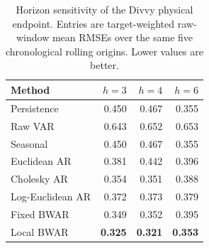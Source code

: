 \begin{table}[H]
\centering
\caption{Horizon sensitivity of the Divvy physical endpoint. Entries are target-weighted raw-window mean RMSEs over the same five chronological rolling origins. Lower values are better.}
\label{tab:divvy-horizon}
\begin{tabular}{lrrr}
\toprule
Method & \(h=3\) & \(h=4\) & \(h=6\) \\
\midrule
Persistence & 0.450 & 0.467 & 0.355 \\
Raw VAR & 0.643 & 0.652 & 0.653 \\
Seasonal & 0.450 & 0.467 & 0.355 \\
Euclidean AR & 0.381 & 0.442 & 0.396 \\
Cholesky AR & 0.354 & 0.351 & 0.388 \\
Log-Euclidean AR & 0.372 & 0.373 & 0.379 \\
Fixed BWAR & 0.349 & 0.352 & 0.395 \\
Local BWAR & \textbf{0.325} & \textbf{0.321} & \textbf{0.353} \\
\bottomrule
\end{tabular}
\end{table}
